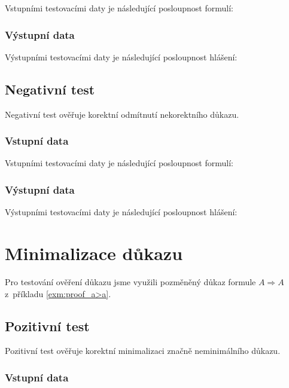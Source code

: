 \documentclass[thesis=B,czech,hidelinks]{thesis}[2012/06/26]
\begin{document}
Vstupními testovacími daty je následující posloupnost formulí:


\subsubsection{Výstupní data}

Výstupními testovacími daty je následující posloupnost hlášení:


\subsection{Negativní test}

Negativní test ověřuje korektní odmítnutí nekorektního důkazu.

\subsubsection{Vstupní data}

Vstupními testovacími daty je následující posloupnost formulí:


\subsubsection{Výstupní data}

Výstupními testovacími daty je následující posloupnost hlášení:


\section{Minimalizace důkazu}

Pro testování ověření důkazu jsme využili pozměněný důkaz formule $A \Rightarrow A$ z~příkladu \ref{exm:proof_a>a}.

\subsection{Pozitivní test}

Pozitivní test ověřuje korektní minimalizaci značně neminimálního důkazu.

\subsubsection{Vstupní data}
\end{document}
